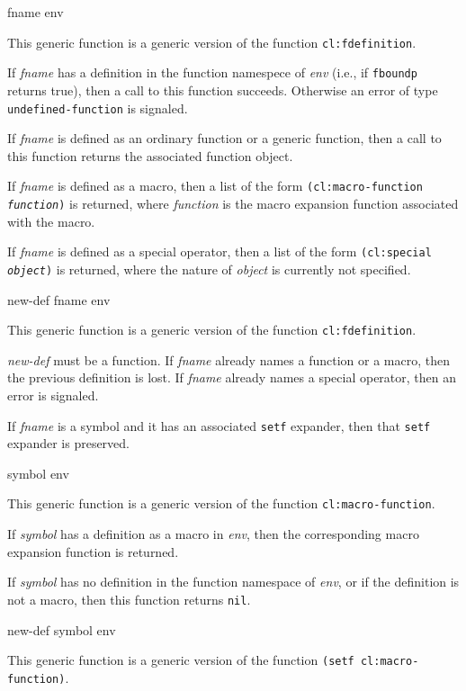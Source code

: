  {fname env}

This generic function is a generic version of the \commonlisp{}
function \texttt{cl:fdefinition}.

If \textit{fname} has a definition in the function namespece of
\textit{env} (i.e., if \texttt{fboundp} returns true), then a call to
this function succeeds.  Otherwise an error of type
\texttt{undefined-function} is signaled.

If \textit{fname} is defined as an ordinary function or a generic
function, then a call to this function returns the associated
function object.

If \textit{fname} is defined as a macro, then a list of the form
\texttt{(cl:macro-function \textrm{\textit{function}})} is returned, where
\textit{function} is the macro expansion function associated with the
macro.

If \textit{fname} is defined as a special operator, then a list of the
form \texttt{(cl:special \textrm{\textit{object}})} is returned, where
  the nature of \textit{object} is currently not specified.

 {new-def fname env}

This generic function is a generic version of the \commonlisp{}
function \texttt{cl:fdefinition}.

\textit{new-def} must be a function.  If \textit{fname} already names
a function or a macro, then the previous definition is lost.  If
\textit{fname} already names a special operator, then an error is
signaled.

If \textit{fname} is a symbol and it has an associated \texttt{setf}
expander, then that \texttt{setf} expander is preserved.

 {symbol env}

This generic function is a generic version of the \commonlisp{}
function \texttt{cl:macro-function}.

If \textit{symbol} has a definition as a macro in \textit{env}, then the
corresponding macro expansion function is returned.

If \textit{symbol} has no definition in the function namespace of
\textit{env}, or if the definition is not a macro, then this
function returns \texttt{nil}.


 {new-def symbol env}

This generic function is a generic version of the \commonlisp{}
function \texttt{(setf cl:macro-function)}.

